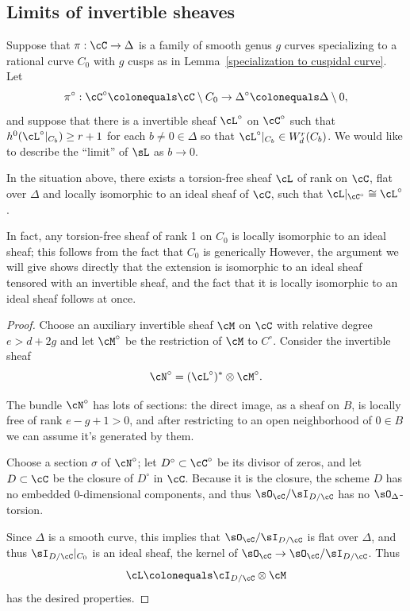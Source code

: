 \subsection*{Limits of invertible sheaves}

Suppose  that  $\pi : \cC \to \Delta$ is a family of smooth genus $g$
%
curves specializing to a rational curve $C_0$ with $g$ cusps as in
Lemma~\ref{specialization to cuspidal curve}.
 Let
$$
\pi^\circ: \cC^\circ \colonequals  \cC \setminus C_0\to \Delta^\circ
\colonequals  \Delta\setminus 0,
$$
and suppose that there is a invertible sheaf $\cL^\circ$ on $\cC^\circ$
such that $h^0(\cL^\circ|_{C_b}) \geq r+1$ for each $b \neq 0 \in \Delta$
so that $\cL^\circ|_{C_b}\in W^{r}_{d}(C_{b})$. We would like to describe
the ``limit'' of $\sL$ as $b \to 0$.


\begin{lemma}\label{limit sheaf}
In the situation above, there exists a torsion-free sheaf $\cL$ of rank
%
\1 on $\cC$, flat over $\Delta$ and locally isomorphic to
an ideal sheaf of $\cC$, such that $\cL|_{\cC^\circ} \cong\nobreak \cL^\circ$.
\unif
\end{lemma}

In fact, any torsion-free sheaf of rank 1 on $C_{0}$ is locally isomorphic
to an ideal sheaf; this follows from the fact that $C_{0}$ is generically
%
However, the argument we will give
shows directly that the extension is isomorphic to an ideal sheaf tensored
with an invertible sheaf, and the fact that
it is locally isomorphic to an ideal sheaf follows at once.

\begin{proof} Choose an auxiliary invertible sheaf $\cM$ on $\cC$ with
relative degree $e > d + 2g$ and let $\cM^\circ$ be the restriction of
$\cM$ to $C^\circ$. Consider the invertible sheaf
$$
\cN^\circ = (\cL^\circ)^* \otimes \cM^\circ.
$$

The bundle $\cN^\circ$ has lots of sections: the direct image, as a sheaf
on $B$, is locally free of rank $e-g+1 > 0$, and after restricting to
an open neighborhood of $0 \in B$ we can assume it's generated by them.

Choose a section $\sigma$ of $\cN^\circ$; let $D^\circ \subset \cC^\circ$
be its divisor of zeros, and let $D \subset \cC$ be the closure of
$D^\circ$ in $\cC$. Because it is the closure, the scheme $D$ has
no embedded
0-dimensional components, and thus $\sO_{\cC}/\sI_{D/\cC}$ has no
$\sO_{\Delta}$-torsion.

Since $\Delta$ is a smooth
curve, this implies that $\sO_{\cC}/\sI_{D/\cC}$ is flat over $\Delta$,
and thus $\sI_{D/\cC}|_{C_{0}}$
is an ideal sheaf, the kernel of $\sO_{\cC} \to
\sO_{\cC}/\sI_{D/\cC}$. Thus
$$
\cL \colonequals  \cI_{D/\cC} \otimes \cM
$$
has the desired properties.
\unif
\end{proof}

